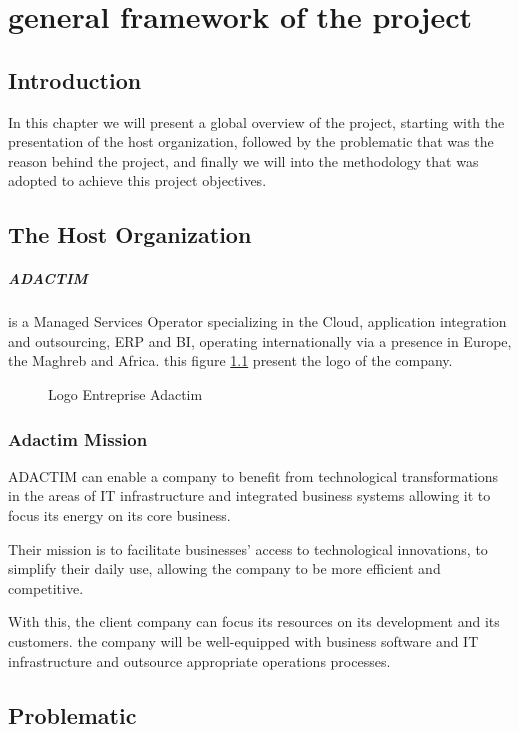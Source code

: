 \chapter{general framework of the project}
\section*{Introduction}
In this chapter we will present a global overview of the project, starting with the presentation of the host organization, followed by the problematic that was the reason behind the project, and finally we will into the methodology that was adopted to achieve this project objectives.
\section{The Host Organization}
\paragraph[short]{ADACTIM}
is a Managed Services Operator specializing in the Cloud, application integration and outsourcing, ERP and BI, operating internationally via a presence in Europe, the Maghreb and Africa.
\newline
this figure \ref{fig:logo_Adactim} present the logo of the company.

\begin{figure}[htpb]
    \centering
    \caption{Logo Entreprise Adactim}
    \label{fig:logo_Adactim}
\end{figure}

\subsection*{Adactim  Mission}
ADACTIM can enable a company to benefit from technological transformations in the areas of IT infrastructure and integrated business systems allowing it to focus its energy on its core business.
\par
Their mission is to facilitate businesses' access to technological innovations, to simplify their daily use, allowing the company to be more efficient and competitive.
\par
With this, the client company can focus its resources on its development and its customers. the company will be well-equipped with business software and IT infrastructure and outsource appropriate operations processes.
\section{Problematic}

